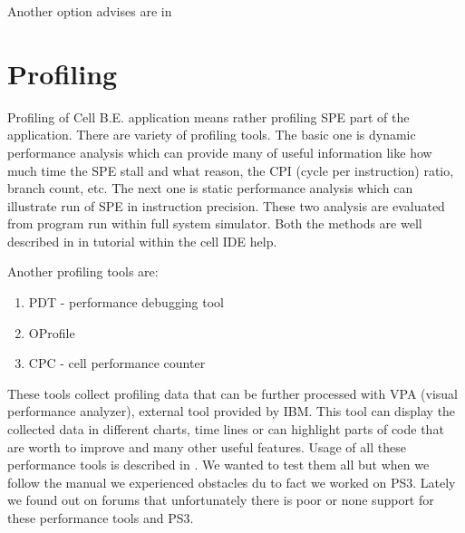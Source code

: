 \par
Another option advises are in \cite{compilerOptions}

\section{Profiling }

\par
Profiling of Cell B.E. application means rather profiling SPE part of the application.
There are variety of profiling tools.
The basic one is dynamic performance analysis which can provide many of useful information like how much time the SPE stall and what reason, the CPI (cycle per instruction) ratio, branch count, etc.
The next one is static performance analysis which can illustrate run of SPE in instruction precision.
These two analysis are evaluated from program run within full system simulator.
Both the methods are well described in in tutorial within the cell IDE help.

\par
Another profiling tools are:
\begin{enumerate}
\item{PDT - performance debugging tool}
\item{OProfile}
\item{CPC - cell performance counter}
\end{enumerate}

These tools collect profiling data that can be further processed with VPA (visual performance analyzer), external tool provided by IBM.
This tool can display the collected data in different charts, time lines or can highlight parts of code that are worth to improve and many other useful features.
Usage of all these performance tools is described in \cite{performanceToolRef}.
We wanted to test them all but when we follow the manual we experienced obstacles du to fact we worked on PS3.
Lately we found out on forums that unfortunately there is poor or none support for these performance tools and PS3.